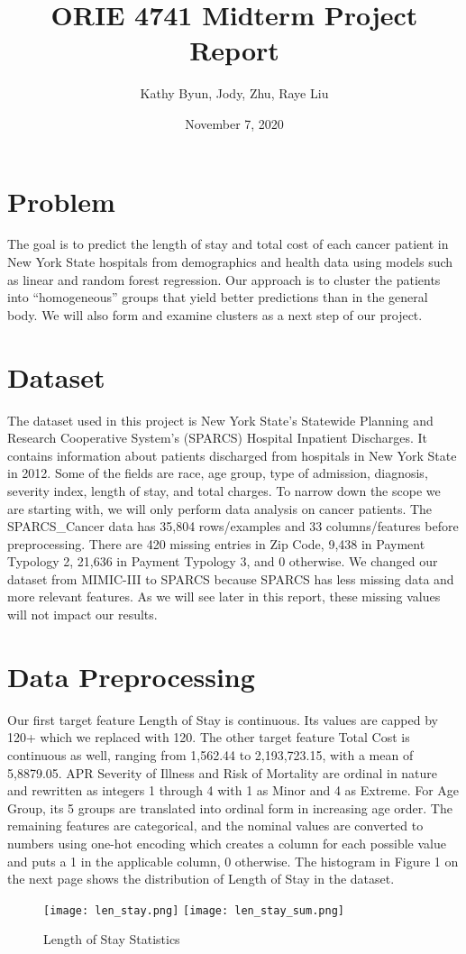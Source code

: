 \documentclass{article}
\title{ORIE 4741 \space \space Midterm Project Report}
\author{Kathy Byun, Jody, Zhu, Raye Liu}
\date{November 7, 2020}
\begin{document}
\maketitle

\section{Problem}
The goal is to predict the length of stay and total cost of each cancer patient in New York State hospitals from demographics and health data using models such as linear and random forest regression. Our approach is to cluster the patients into “homogeneous” groups that yield better predictions than in the general body. We will also form and examine clusters as a next step of our project. 

\section{Dataset}
The dataset used in this project is New York State’s Statewide Planning and Research Cooperative System’s (SPARCS) Hospital Inpatient Discharges. It contains information about patients discharged from hospitals in New York State in 2012. Some of the fields are race, age group, type of admission, diagnosis, severity index, length of stay, and total charges. To narrow down the scope we are starting with, we will only perform data analysis on cancer patients. The SPARCS\_Cancer data has 35,804 rows/examples and 33 columns/features before preprocessing. There are 420 missing entries in Zip Code, 9,438 in Payment Typology 2, 21,636 in Payment Typology 3, and 0 otherwise. We changed our dataset from MIMIC-III to SPARCS because SPARCS has less missing data and more relevant features. As we will see later in this report, these missing values will not impact our results.

\section{Data Preprocessing}
Our first target feature Length of Stay is continuous. Its values are capped by 120+ which we replaced with 120. The other target feature Total Cost is continuous as well, ranging from 1,562.44 to 2,193,723.15, with a mean of 5,8879.05. APR Severity of Illness and Risk of Mortality are ordinal in nature and rewritten as integers 1 through 4 with 1 as Minor and 4 as Extreme. For Age Group, its 5 groups are translated into ordinal form in increasing age order. The remaining features are categorical, and the nominal values are converted to numbers using one-hot encoding which creates a column for each possible value and puts a 1 in the applicable column, 0 otherwise.
\newline
The histogram in Figure 1 on the next page shows the distribution of Length of Stay in the dataset.
\begin{figure}[h!]
\centering
\texttt{[image: len\_stay.png]}
\texttt{[image: len\_stay\_sum.png]}
\caption{Length of Stay Statistics}
\end{figure}
\end{document}
